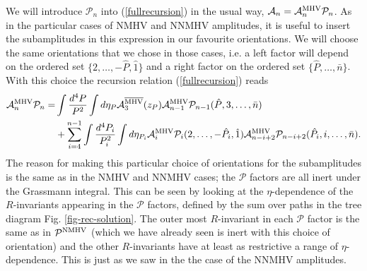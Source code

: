 \documentclass[12pt]{article}
\begin{document}
{We will introduce $\mathcal{P}_n$ into (\ref{fullrecursion}) in the usual way, $\mathcal{A}_n = \mathcal{A}_n^{\rm MHV} \mathcal{P}_n$.
As in the particular cases of NMHV and NNMHV amplitudes, it is useful to insert the subamplitudes in this expression in our favourite orientations. We will choose the same orientations that we chose in those cases, i.e. a left factor will depend on the ordered set $\{2,\ldots,-\hat{P},\hat{1} \}$ and a right factor on the ordered set $\{ \hat{P},\ldots,\bar{n} \}$. With this choice the recursion relation (\ref{fullrecursion}) reads
\begin{align}
\mathcal{A}_n^{\rm MHV} \mathcal{P}_n = &\int \frac{d^4P}{P^2} \int d \eta_P \mathcal{A}^{\overline{\rm MHV}}_3(z_P) \mathcal{A}_{n-1}^{\rm MHV} \mathcal{P}_{n-1}(\hat{P},3,\ldots,\bar{n}) \notag\\
&+ \sum_{i=4}^{n-1} \int \frac{d^4 P_i}{P_i^2} \int d\eta_{P_i} \mathcal{A}_i^{\rm MHV} \mathcal{P}_i (2,\ldots,-\hat{P_i},\hat{1}) \mathcal{A}_{n-i+2}^{\rm MHV} \mathcal{P}_{n-i+2}(\hat{P_i},i,\ldots,\bar{n}) .
\label{fullrecinter}
\end{align}
The reason for making this particular choice of orientations for the subamplitudes is the same as in the NMHV and NNMHV cases; the $\mathcal{P}$ factors are all inert under the Grassmann integral. This can be seen by looking at the $\eta$-dependence of the $R$-invariants appearing in the $\mathcal{P}$ factors, defined by the sum over paths in the tree diagram Fig. \ref{fig-rec-solution}. The outer most $R$-invariant in each $\mathcal{P}$ factor is the same as in $\mathcal{P}^{\rm NMHV}$ (which we have already seen is inert with this choice of orientation) and the other $R$-invariants have at least as restrictive a range of $\eta$-dependence. This is just as we saw in the the case of the NNMHV amplitudes. 

}
\end{document}
